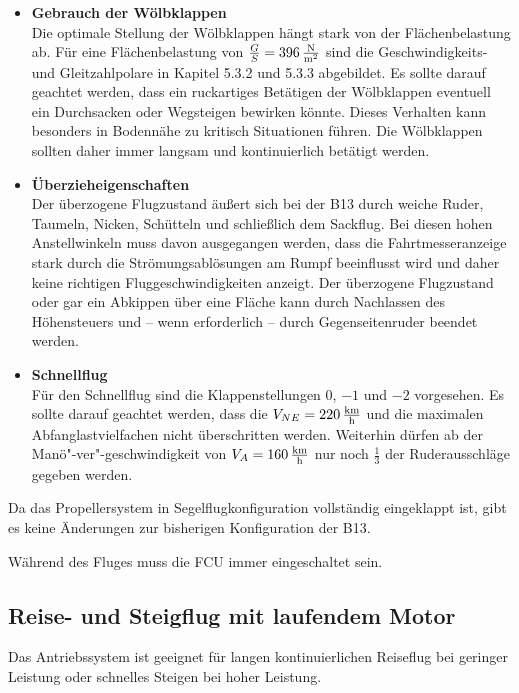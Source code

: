 \begin{itemize}
\item \textbf{Gebrauch der Wölbklappen}\\
Die optimale Stellung der Wölbklappen hängt stark von der Flächenbelastung ab. Für eine Flächenbelastung von $\frac{G}{S}=\unit[396]{\frac{N}{m^2}}$ sind die Geschwindigkeits- und Gleitzahlpolare in Kapitel 5.3.2 und 5.3.3 abgebildet. 
Es sollte darauf geachtet werden, dass ein ruckartiges Betätigen der Wölbklappen eventuell ein Durchsacken oder Wegsteigen bewirken könnte. Dieses Verhalten kann besonders in Bodennähe zu kritisch Situationen führen. Die Wölbklappen sollten daher immer langsam und kontinuierlich betätigt werden. 
\item \textbf{Überzieheigenschaften}\\
Der überzogene Flugzustand äußert sich bei der B13 durch weiche Ruder, Taumeln, Nicken, Schütteln und schließlich dem Sackflug. Bei diesen hohen Anstellwinkeln muss davon ausgegangen werden, dass die Fahrtmesseranzeige stark durch die Strömungsablösungen am Rumpf beeinflusst wird und daher keine richtigen Fluggeschwindigkeiten anzeigt.  Der überzogene Flugzustand oder gar ein Abkippen über eine Fläche kann durch Nachlassen des Höhensteuers und – wenn erforderlich – durch Gegenseitenruder beendet werden. 
\item \textbf{Schnellflug}\\
Für den Schnellflug sind die Klappenstellungen $0$, $-1$ und $-2$ vorgesehen. Es sollte darauf geachtet werden, dass die $V_{NE} = \unit[220]{\frac{km}{h}}$  und die maximalen Abfanglastvielfachen nicht überschritten werden. Weiterhin dürfen ab der Manö"-ver"-geschwindigkeit von $V_A = \unit[160]{\frac{km}{h}}$ nur noch $\frac{1}{3}$ der Ruderausschläge gegeben werden. 

\end{itemize}

Da das Propellersystem in Segelflugkonfiguration vollständig eingeklappt ist, gibt es keine Änderungen zur bisherigen Konfiguration der B13.

Während des Fluges muss die FCU immer eingeschaltet sein.

\newpage
\subsection{Reise- und Steigflug mit laufendem Motor}
Das Antriebssystem ist geeignet für langen kontinuierlichen Reiseflug bei geringer Leistung oder schnelles Steigen bei hoher Leistung.\\

